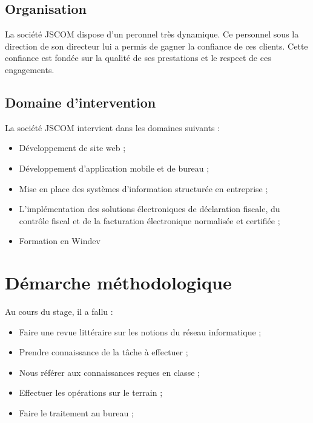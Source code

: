 \documentclass[a4paper,12pt,french]{report} %
\begin{document}
	\subsection{Organisation}
	La société JSCOM dispose d'un peronnel très dynamique. Ce personnel sous la direction de son directeur lui a permis de gagner la confiance de ces clients. Cette confiance est fondée sur la qualité de ses prestations et le respect de ces engagements.
	
	\subsection{Domaine d'intervention}
	La société JSCOM intervient dans les domaines suivants :
	\begin{itemize}
		\item Développement de site web ;
		\item Développement d'application mobile et de bureau ;
		\item Mise en place des systèmes d'information structurée en entreprise ;
		\item L'implémentation des solutions électroniques de déclaration fiscale, du contrôle fiscal et de la facturation électronique normalisée et certifiée ;
		\item Formation en Windev

	\end{itemize}

		
\section{Démarche méthodologique}
	Au cours du stage, il a fallu :
	\begin{itemize}
		\item Faire une revue littéraire sur les notions du réseau informatique ;
		\item Prendre connaissance de la tâche à effectuer ;
		\item Nous référer aux connaissances reçues en classe ;
		\item Effectuer les opérations sur le terrain ;
		\item Faire le traitement au bureau ;
	\end{itemize}
			
\end{document}
